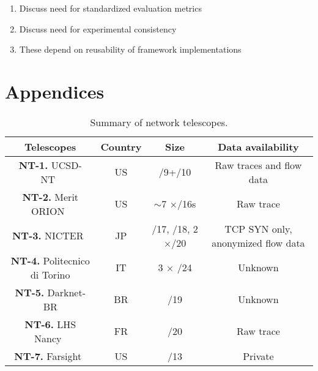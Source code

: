 \documentclass[manuscript,nonacm]{acmart}
\begin{document}
\begin{enumerate}
	\item Discuss need for standardized evaluation metrics
	\item Discuss need for experimental consistency
	\item These depend on reusability of framework implementations
\end{enumerate}


\section{Appendices}

\begin{table}[httb]
	\small
	\caption{Summary of network telescopes.}\label{tab:telescopes}
	\begin{tabular}{cccc}
		\toprule
		Telescopes & Country & Size & Data availability\\
		\midrule
		\textbf{NT-1.} UCSD-NT~\cite{caida2025ucsdnt} & US & /9+/10 & Raw traces and flow data \\
		\textbf{NT-2.} Merit ORION~\cite{orion} & US & $\sim$7 $\times$/16s & Raw trace\\
		\textbf{NT-3.} NICTER~\cite{nicter2025nt} & JP &  /17, /18, 2$\times$/20 & TCP SYN only, anonymized flow data\\
		\textbf{NT-4.} Politecnico di Torino \cite{2020soro} & IT & 3 $\times$ /24 & Unknown\\
		\textbf{NT-5.} Darknet-BR \cite{CunhaCamargo2025darknetbr} & BR & /19 & Unknown\\
		\textbf{NT-6.} LHS Nancy~\cite{inria2025nt} & FR & /20 & Raw trace\\
		\textbf{NT-7.} Farsight~\cite{@@} & US & /13 & Private\\
		\bottomrule
	\end{tabular}
\end{table}
\end{document}
